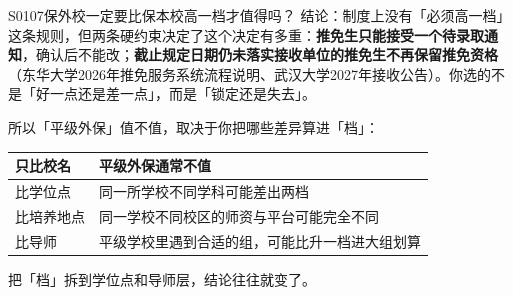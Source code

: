 \begin{qa}{S0107}{保外校一定要比保本校高一档才值得吗？}
结论：制度上没有「必须高一档」这条规则，但两条硬约束决定了这个决定有多重：\textbf{推免生只能接受一个待录取通知}，确认后不能改；\textbf{截止规定日期仍未落实接收单位的推免生不再保留推免资格}（东华大学2026年推免服务系统流程说明、武汉大学2027年接收公告）。你选的不是「好一点还是差一点」，而是「锁定还是失去」。

所以「平级外保」值不值，取决于你把哪些差异算进「档」：

\par\vspace{2pt}\nobreak\begin{center}\footnotesize
\begin{tabularx}{\textwidth}{>{\raggedright\arraybackslash}X>{\raggedright\arraybackslash}X}
\toprule
\textbf{只比校名} & \textbf{平级外保通常不值} \\ \midrule
比学位点 & 同一所学校不同学科可能差出两档 \\
比培养地点 & 同一学校不同校区的师资与平台可能完全不同 \\
比导师 & 平级学校里遇到合适的组，可能比升一档进大组划算 \\
\bottomrule
\end{tabularx}
\end{center}\vspace{2pt}\par

把「档」拆到学位点和导师层，结论往往就变了。
\end{qa}

